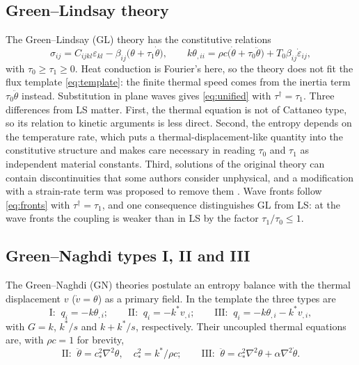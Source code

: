 \subsection{Green--Lindsay theory}\label{sec:gl}
The Green--Lindsay (GL) theory \citep{Green1972} has the constitutive relations
\begin{equation}
\sigma_{ij}=C_{ijkl}\varepsilon_{kl}-\beta_{ij}\bigl(\theta+\tau_1\dot\theta\bigr),\qquad
k\theta_{,ii}=\rho c\bigl(\dot\theta+\tau_0\ddot\theta\bigr)+T_0\beta_{ij}\dot\varepsilon_{ij},\label{eq:GL}
\end{equation}
with $\tau_0\ge\tau_1\ge0$. Heat conduction is Fourier's here, so the theory does not fit the flux template \eqref{eq:template}: the finite thermal speed comes from the inertia term $\tau_0\ddot\theta$ instead. Substitution in plane waves gives \eqref{eq:unified} with $\tau^\dagger=\tau_1$. Three differences from LS matter. First, the thermal equation is not of Cattaneo type, so its relation to kinetic arguments is less direct. Second, the entropy depends on the temperature rate, which puts a thermal-displacement-like quantity into the constitutive structure and makes care necessary in reading $\tau_0$ and $\tau_1$ as independent material constants. Third, solutions of the original theory can contain discontinuities that some authors consider unphysical, and a modification with a strain-rate term was proposed to remove them \citep{Yu2018ModifiedGL}. Wave fronts follow \eqref{eq:fronts} with $\tau^\dagger=\tau_1$, and one consequence distinguishes GL from LS: at the wave fronts the coupling is weaker than in LS by the factor $\tau_1/\tau_0\le1$.

\subsection{Green--Naghdi types I, II and III}\label{sec:gn}
The Green--Naghdi (GN) theories \citep{Green1991,GreenGN1992,Green1993} postulate an entropy balance with the thermal displacement $v$ ($\dot v=\theta$) as a primary field. In the template the three types are
\begin{equation}
\text{I: }\ q_i=-k\theta_{,i};\qquad
\text{II: }\ q_i=-k^*v_{,i};\qquad
\text{III: }\ q_i=-k\theta_{,i}-k^*v_{,i},
\end{equation}
with $G=k$, $k^*/s$ and $k+k^*/s$, respectively. Their uncoupled thermal equations are, with $\rho c=1$ for brevity,
\begin{equation}
\text{II: }\ \ddot\theta=c_*^2\nabla^2\theta,\quad c_*^2=k^*/\rho c;\qquad
\text{III: }\ \ddot\theta=c_*^2\nabla^2\theta+\alpha\nabla^2\dot\theta.
\end{equation}
